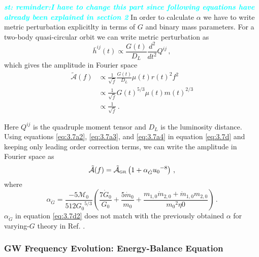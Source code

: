 \documentclass[prd,twocolumn,nofootinbib]{revtex4-1}
\newcommand{\GR}{{\mbox{\tiny GR}}}
\newcommand{\st}[1]{\textcolor{cyan}{\it{\textbf{st: #1}}} }
\begin{document}
 \hspace*{15.5pt}\st{reminder:I have to change this part since following equations have already been explained in section 2}In order to calculate $\alpha$ we have to write metric perturbation explicitlty in terms of $G$ and binary mass parameters. For a two-body quasi-circular orbit we can write metric perturbation as \cite{Blanchet:2002av}
 \begin{equation}
\bar{h}^{ij}(t)\propto \frac{G(t)}{D_L}\frac{d^2 }{d t^2}Q^{ij}\,,
 \end{equation}
which gives the amplitude in Fourier space
\begin{align}\label{eq:3.7d}
\tilde{\mathcal{A}}(f)&\propto\frac{1}{\sqrt{\dot{f}}}\frac{G(t)}{D_L}\mu(t) r(t)^2f^2\nonumber\\&\propto\frac{1}{\sqrt{\dot{f}}}{G(t)}^{5/3}\mu(t){m(t)}^{2/3}\nonumber\\ &\propto \frac{1}{\sqrt{\dot{f}}}  \,.
\end{align} 
 

Here $Q^{ij}$ is the quadruple moment tensor and $D_L$ is the luminosity distance. Using equations \eqref{eq:3.7a2}, \eqref{eq:3.7a3}, and \eqref{eq:3.7a4} in equation \eqref{eq:3.7d} and keeping only leading order correction terms, we can write the amplitude in Fourier space as
\begin{equation}
\tilde{\mathcal{A}}(f)=\tilde{\mathcal{A}}_{\GR}\left(1+\alpha_{\dot{G}}{u_0}^{-8}\right)\,,
\end{equation}
where
\begin{equation}\label{eq:3.7d2}
 \alpha_{\dot{G}}=\frac{-5\mathcal{M}_0}{512 {G_0}^{5/3}} \left(\frac{7 \dot{G}_0}{ G_0} + \frac{5\dot{m}_0}{m_0}+\frac{m_{1,0}\dot{m}_{2,0}+\dot{m}_{1,0}m_{2,0}}{{m_0}^2 \eta0}\right)\,.
 \end{equation}
 \hspace{15.5pt} $\alpha_{\dot{G}}$ in equation \eqref{eq:3.7d2} does not match with the previously obtained $\alpha$ for varying-$G$ theory in Ref. \cite{Yunes:2009bv}.
 
 \subsubsection*{GW Frequency Evolution: Energy-Balance Equation}
 
\end{document}
